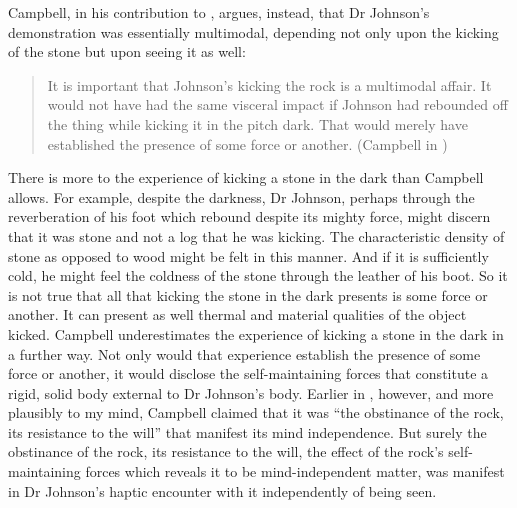 \documentclass[12pt]{article}
\begin{document}
Campbell, in his contribution to \citet[71]{Campbell:2014aa}, argues, instead, that Dr Johnson's demonstration was essentially multimodal, depending not only upon the kicking of the stone but upon seeing it as well:
\begin{quote}
	It is important that Johnson's kicking the rock is a multimodal affair. It would not have had the same visceral impact if Johnson had rebounded off the thing while kicking it in the pitch dark. That would merely have established the presence of some force or another. (Campbell in \citealt[71]{Campbell:2014aa})
\end{quote}
There is more to the experience of kicking a stone in the dark than Campbell allows. For example, despite the darkness, Dr Johnson, perhaps through the reverberation of his foot which rebound despite its mighty force, might discern that it was stone and not a log that he was kicking. The characteristic density of stone as opposed to wood might be felt in this manner. And if it is sufficiently cold, he might feel the coldness of the stone through the leather of his boot. So it is not true that all that kicking the stone in the dark presents is some force or another. It can present as well thermal and material qualities of the object kicked. Campbell underestimates the experience of kicking a stone in the dark in a further way. Not only would that experience establish the presence of some force or another, it would disclose the self-maintaining forces that constitute a rigid, solid body external to Dr Johnson's body. Earlier in \citet[26]{Campbell:2014aa}, however, and more plausibly to my mind, Campbell claimed that it was ``the obstinance of the rock, its resistance to the will'' that manifest its mind independence. But surely the obstinance of the rock, its resistance to the will, the effect of the rock's self-maintaining forces which reveals it to be mind-independent matter, was manifest in Dr Johnson's haptic encounter with it independently of being seen.
\end{document}
